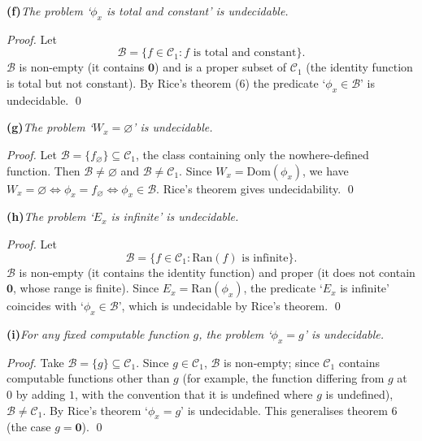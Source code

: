 \documentclass[fleqn]{article}
\begin{document}
\bigskip

\noindent\textbf{(f)}\quad\textit{The problem `$\phi_x$ is total and constant' is undecidable.}

\medskip

\textit{Proof.} Let
\[
\mathscr{B} = \{ f \in \mathscr{C}_1 : f \text{ is total and constant} \}.
\]
$\mathscr{B}$ is non-empty (it contains $\mathbf{0}$) and is a proper subset of $\mathscr{C}_1$ (the identity function is total but not constant). By Rice's theorem (6) the predicate `$\phi_x \in \mathscr{B}$' is undecidable. \qed

\bigskip

\noindent\textbf{(g)}\quad\textit{The problem `$W_x = \varnothing$' is undecidable.}

\medskip

\textit{Proof.} Let $\mathscr{B} = \{ f_\varnothing \} \subseteq \mathscr{C}_1$, the class containing only the nowhere-defined function. Then $\mathscr{B} \neq \varnothing$ and $\mathscr{B} \neq \mathscr{C}_1$. Since $W_x = \mathrm{Dom}(\phi_x)$, we have $W_x = \varnothing \iff \phi_x = f_\varnothing \iff \phi_x \in \mathscr{B}$. Rice's theorem gives undecidability. \qed

\bigskip

\noindent\textbf{(h)}\quad\textit{The problem `$E_x$ is infinite' is undecidable.}

\medskip

\textit{Proof.} Let
\[
\mathscr{B} = \{ f \in \mathscr{C}_1 : \mathrm{Ran}(f) \text{ is infinite} \}.
\]
$\mathscr{B}$ is non-empty (it contains the identity function) and proper (it does not contain $\mathbf{0}$, whose range is finite). Since $E_x = \mathrm{Ran}(\phi_x)$, the predicate `$E_x$ is infinite' coincides with `$\phi_x \in \mathscr{B}$', which is undecidable by Rice's theorem. \qed

\bigskip

\noindent\textbf{(i)}\quad\textit{For any fixed computable function $g$, the problem `$\phi_x = g$' is undecidable.}

\medskip

\textit{Proof.} Take $\mathscr{B} = \{g\} \subseteq \mathscr{C}_1$. Since $g \in \mathscr{C}_1$, $\mathscr{B}$ is non-empty; since $\mathscr{C}_1$ contains computable functions other than $g$ (for example, the function differing from $g$ at $0$ by adding $1$, with the convention that it is undefined where $g$ is undefined), $\mathscr{B} \neq \mathscr{C}_1$. By Rice's theorem `$\phi_x = g$' is undecidable. This generalises theorem 6 (the case $g = \mathbf{0}$). \qed

\bigskip
\end{document}
